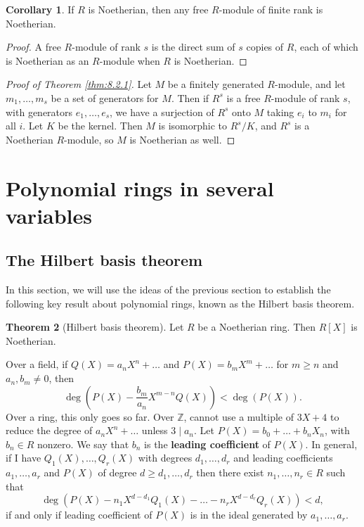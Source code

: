 \documentclass{article}
\newcommand{\Z}{\mathbb{Z}}
\newcommand{\rb}[1]{\left( #1 \right)}
\renewcommand{\sb}[1]{\left[ #1 \right]}
\theoremstyle{definition}\newtheorem{definition}{Definition}[subsection]
\theoremstyle{definition}\newtheorem{remark}[definition]{Remark}
\theoremstyle{definition}\newtheorem*{example}{Example}
\theoremstyle{definition}\newtheorem*{note}{Note}
\newtheorem{theorem}[definition]{Theorem}
\newtheorem{corollary}[definition]{Corollary}
\begin{document}
\begin{corollary}
If $ R $ is Noetherian, then any free $ R $-module of finite rank is Noetherian.
\end{corollary}

\begin{proof}
A free $ R $-module of rank $ s $ is the direct sum of $ s $ copies of $ R $, each of which is Noetherian as an $ R $-module when $ R $ is Noetherian.
\end{proof}

\begin{proof}[Proof of Theorem \ref{thm:8.2.1}]
Let $ M $ be a finitely generated $ R $-module, and let $ m_1, \dots, m_s $ be a set of generators for $ M $. Then if $ R^s $ is a free $ R $-module of rank $ s $, with generators $ e_1, \dots, e_s $, we have a surjection of $ R^s $ onto $ M $ taking $ e_i $ to $ m_i $ for all $ i $. Let $ K $ be the kernel. Then $ M $ is isomorphic to $ R^s / K $, and $ R^s $ is a Noetherian $ R $-module, so $ M $ is Noetherian as well.
\end{proof}

\section{Polynomial rings in several variables}

\subsection{The Hilbert basis theorem}

In this section, we will use the ideas of the previous section to establish the following key result about polynomial rings, known as the Hilbert basis theorem.

\begin{theorem}[Hilbert basis theorem]
\label{thm:9.1.1}
Let $ R $ be a Noetherian ring. Then $ R\sb{X} $ is Noetherian.
\end{theorem}


Over a field, if $ Q\rb{X} = a_nX^n + \dots $ and $ P\rb{X} = b_mX^m + \dots $ for $ m \ge n $ and $ a_n, b_m \ne 0 $, then
$$ \deg\rb{P\rb{X} - \dfrac{b_m}{a_n}X^{m - n}Q\rb{X}} < \deg\rb{P\rb{X}}. $$
Over a ring, this only goes so far. Over $ \Z $, cannot use a multiple of $ 3X + 4 $ to reduce the degree of $ a_nX^n + \dots $ unless $ 3 \mid a_n $. Let $ P\rb{X} = b_0 + \dots + b_nX_n $, with $ b_n \in R $ nonzero. We say that $ b_n $ is the \textbf{leading coefficient} of $ P\rb{X} $. In general, if I have $ Q_1\rb{X}, \dots, Q_r\rb{X} $ with degrees $ d_1, \dots, d_r $ and leading coefficients $ a_1, \dots, a_r $ and $ P\rb{X} $ of degree $ d \ge d_1, \dots, d_r $ then there exist $ n_1, \dots, n_r \in R $ such that
$$ \deg\rb{P\rb{X} - n_1X^{d - d_1}Q_1\rb{X} - \dots - n_rX^{d - d_r}Q_r\rb{X}} < d, $$
if and only if leading coefficient of $ P\rb{X} $ is in the ideal generated by $ a_1, \dots, a_r $. 
\end{document}
